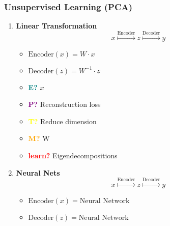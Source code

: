 \subsubsection{Unsupervised Learning (PCA)}
\begin{example} 
    \begin{enumerate}
        \item \textbf{Linear Transformation}
        \begin{equation}
            x \overset{\text{Encoder}}{\mapsto} z \overset{\text{Decoder}}{\mapsto} y
        \end{equation}
        \begin{itemize}
            \item $\text{Encoder}(x) = W \cdot x$
            \item $\text{Decoder}(z) = W^{-1} \cdot z$
        \end{itemize}
        \vspace{1em}
    
        \begin{itemize}
            \item \textcolor{teal}{\textbf{E?}} $x$
            \item \textcolor{purple}{\textbf{P?}} Reconstruction loss
            \item \textcolor{yellow}{\textbf{T?}} Reduce dimension
            \item \textcolor{orange}{\textbf{M?}} W
            \item \textcolor{red}{\textbf{learn?}} Eigendecompositions
        \end{itemize}
        \item \textbf{Neural Nets}
        \begin{equation}
            x \overset{\text{Encoder}}{\mapsto} z \overset{\text{Decoder}}{\mapsto} y
        \end{equation}
        \begin{itemize}
            \item $\text{Encoder}(x) = \text{Neural Network}$
            \item $\text{Decoder}(z) = \text{Neural Network}$
        \end{itemize}
    \end{enumerate}
\end{example}
\newpage

